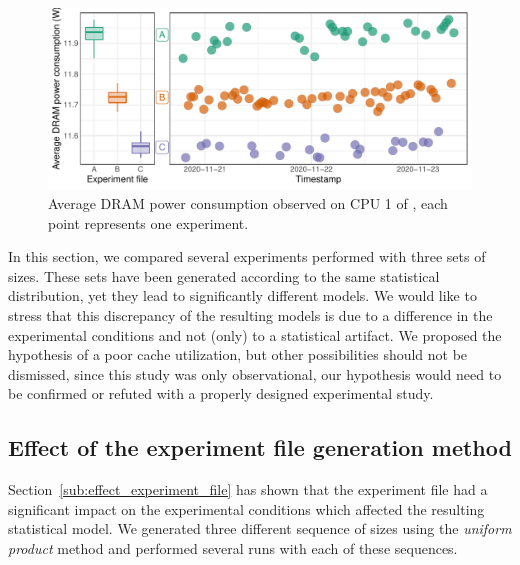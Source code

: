             \begin{figure}[tpb]
                \centering
                \includegraphics[width=\linewidth]{img/experiment/randomizing_sizes/expfile/average_power.pdf}
                \caption{Average DRAM power consumption observed on CPU 1 of \dahu[5], each point represents one
                experiment.}%
                \label{fig:randomizing_sizes:expfile:average_power}
            \end{figure}

            In this section, we compared several \dgemm experiments performed with three sets of sizes. These sets have
            been generated according to the same statistical distribution, yet they lead to significantly different
            \dgemm models. We would like to stress that this discrepancy of the resulting models is due to a difference
            in the experimental conditions and not (only) to a statistical artifact. We proposed the hypothesis of a
            poor cache utilization, but other possibilities should not be dismissed, since this study was only
            observational, our hypothesis would need to be confirmed or refuted with a properly designed experimental
            study.

        \subsection{Effect of the experiment file generation method}%
        \label{sub:effect_experiment_file_generation_method}

            Section~\ref{sub:effect_experiment_file} has shown that the experiment file had a significant impact on the
            experimental conditions which affected the resulting statistical model. We generated three different
            sequence of sizes using the \emph{uniform product} method and performed several runs with each of these
            sequences.

